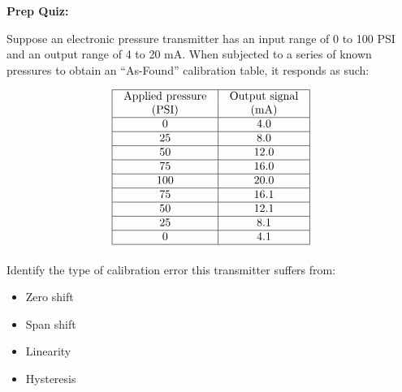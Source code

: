 \noindent
{\bf Prep Quiz:}

Suppose an electronic pressure transmitter has an input range of 0 to 100 PSI and an output range of 4 to 20 mA.  When subjected to a series of known pressures to obtain an ``As-Found'' calibration table, it responds as such:


$$\vbox{\offinterlineskip
\halign{\strut
\vrule \quad\hfil # \ \hfil & 
\vrule \quad\hfil # \ \hfil \vrule \cr
\noalign{\hrule}
%
Applied pressure & Output signal \cr
%
(PSI) & (mA) \cr
%
\noalign{\hrule}
%
0 & 4.0 \cr
%
\noalign{\hrule}
%
25 & 8.0 \cr
%
\noalign{\hrule}
%
50 & 12.0 \cr
%
\noalign{\hrule}
%
75 & 16.0 \cr
%
\noalign{\hrule}
%
100 & 20.0 \cr
%
\noalign{\hrule}
%
75 & 16.1 \cr
%
\noalign{\hrule}
%
50 & 12.1 \cr
%
\noalign{\hrule}
%
25 & 8.1 \cr
%
\noalign{\hrule}
%
0 & 4.1 \cr
%
\noalign{\hrule}
} %
}$$ %

\vskip 10pt

Identify the type of calibration error this transmitter suffers from:

\begin{itemize}
\item{} Zero shift
\vskip 5pt 
\item{} Span shift
\vskip 5pt 
\item{} Linearity
\vskip 5pt 
\item{} Hysteresis
\end{itemize}




